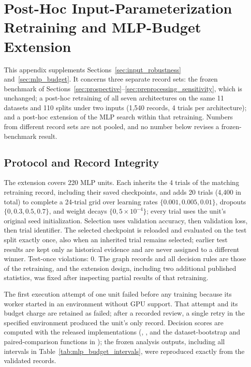 \section{Post-Hoc Input-Parameterization Retraining and MLP-Budget Extension}
\label{app:mlp_budget}

This appendix supplements Sections~\ref{sec:input_robustness} and~\ref{sec:mlp_budget}. It concerns three separate record sets: the frozen benchmark of Sections~\ref{sec:prospective}--\ref{sec:preprocessing_sensitivity}, which is unchanged; a post-hoc retraining of all seven architectures on the same 11 datasets and 110 splits under two inputs (1,540 records, 4 trials per architecture); and a post-hoc extension of the MLP search within that retraining. Numbers from different record sets are not pooled, and no number below revises a frozen-benchmark result.

\subsection{Protocol and Record Integrity}

The extension covers 220 MLP units. Each inherits the 4 trials of the matching retraining record, including their saved checkpoints, and adds 20 trials (4,400 in total) to complete a 24-trial grid over learning rates $\{0.001,0.005,0.01\}$, dropouts $\{0,0.3,0.5,0.7\}$, and weight decays $\{0,5\times10^{-4}\}$; every trial uses the unit's original seed initialization. Selection uses validation accuracy, then validation loss, then trial identifier. The selected checkpoint is reloaded and evaluated on the test split exactly once, also when an inherited trial remains selected; earlier test results are kept only as historical evidence and are never assigned to a different winner. Test-once violations: 0. The graph records and all decision rules are those of the retraining, and the extension design, including two additional published statistics, was fixed after inspecting partial results of that retraining.

The first execution attempt of one unit failed before any training because its worker started in an environment without GPU support. That attempt and its budget charge are retained as failed; after a recorded review, a single retry in the specified environment produced the unit's only record. Decision scores are computed with the released implementations (, , and the dataset-bootstrap and paired-comparison functions in ); the frozen analysis outputs, including all intervals in Table~\ref{tab:mlp_budget_intervals}, were reproduced exactly from the validated records.

